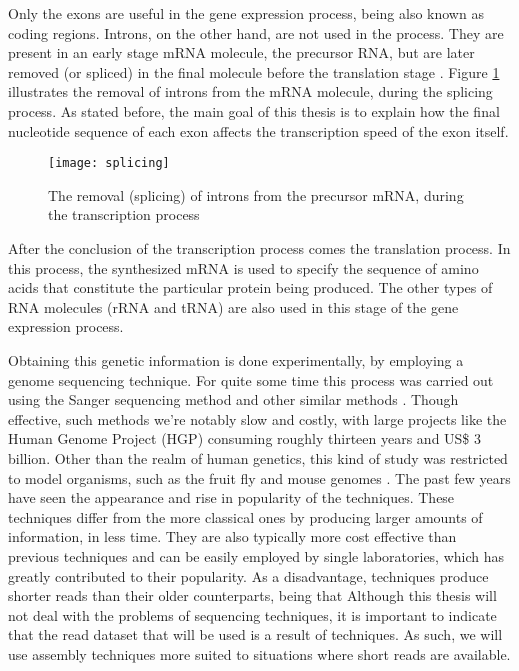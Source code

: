 Only the exons are useful in the gene expression process, being also known as
coding regions. Introns, on the other hand, are not used in the process. They
are present in an early stage mRNA molecule, the precursor RNA, but are later
removed (or spliced) in the final molecule before the translation stage
\cite{leic:gene_expr}. Figure \ref{fig:splicing} illustrates the removal of
introns from the mRNA molecule, during the  splicing process. As stated before,
the main goal of this thesis is to explain how the final nucleotide sequence of
each exon affects the transcription speed of the exon itself.

\begin{figure}[!htb]
  \begin{center}
    \leavevmode
    \texttt{[image: splicing]}
    \caption{The removal (splicing) of introns from the precursor mRNA, during
    the transcription process}
    \label{fig:splicing}
  \end{center}
\end{figure}

After the conclusion of the transcription process comes the translation process.
In this process, the synthesized mRNA is used to specify the sequence of amino
acids that constitute the particular protein being produced. The other types of
RNA molecules (rRNA and tRNA) are also used in this stage of the gene expression
process.

Obtaining this genetic information is done experimentally, by employing a genome
sequencing technique. For quite some time this process was carried out using the
Sanger sequencing method and other similar methods \cite{Reis-Filho2009}. Though
effective, such methods we're notably slow and costly, with large projects like
the Human Genome Project (HGP) consuming roughly thirteen years and US\$ 3
billion. Other than the realm of human genetics, this kind of study was
restricted to model organisms, such as the fruit fly and mouse genomes
\cite{Wolf2013}. The past few years have seen the appearance and rise in
popularity of the \ngs{} techniques. These techniques differ from the more
classical ones by producing larger amounts of information, in less time. They
are also typically more cost effective than previous techniques and can be
easily employed by single laboratories, which has greatly contributed to their
popularity. As a disadvantage, \ngs{} techniques produce shorter reads than
their older counterparts, being that 
\cite[p. 671]{Martin2011} Although this thesis will not deal with the problems
of sequencing techniques, it is important to indicate that the read dataset that
will be used is a result of \ngs{} techniques. As such, we will use assembly
techniques more suited to situations where short reads are available.

